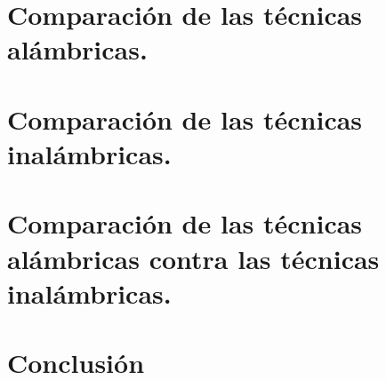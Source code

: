 \documentclass[conference]{IEEEtran}
\begin{document}


\section{Comparación de las técnicas alámbricas.} %

\section{Comparación de las técnicas inalámbricas.} %

\section{Comparación de las técnicas alámbricas contra las técnicas inalámbricas.} %

\section{Conclusión}%


\newpage{}
\printbibliography
\end{document}
